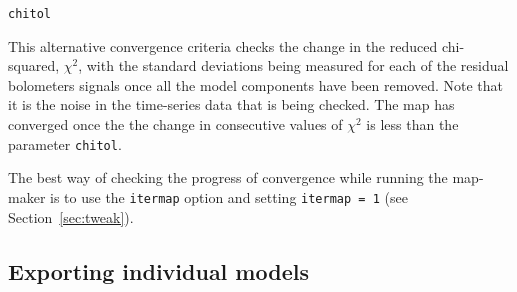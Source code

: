\documentclass[twoside,11pt]{article}
\newcommand{\htmlref}[2]{#1}
\newcommand{\latexhtml}[2]{#1}
\newcommand{\xlabel}[1]{}
\renewcommand{\_}{\texttt{\symbol{95}}}
\newcommand{\param}[1]{\texttt{#1}}
\newcommand{\cref}[3]{\latexhtml{#1~\ref{#2}}{\htmlref{#3}{#2}}}
\begin{document}
\begin{minipage}[t]{0.1\linewidth}
\texttt{chitol}
\end{minipage}
\begin{minipage}[t]{0.9\linewidth}This alternative convergence criteria checks
the change in the reduced chi-squared, $\chi^2$, with the standard deviations
being measured for each of the residual bolometers signals once all the
model components have been removed. Note that it is the noise in the
time-series data that is being checked. The map has converged once the
the change in consecutive values of $\chi^2$ is less than the
parameter \texttt{chitol}.
\vspace{3mm}
\end{minipage}

The best way of checking the progress of convergence while running the
map-maker is to use the \param{itermap} option and setting
\param{itermap = 1} (see \cref{Section}{sec:tweak}{Tweaking the
Configuration File}).


\subsection{\xlabel{export}Exporting individual models}
\label{sec:export}
\end{document}
